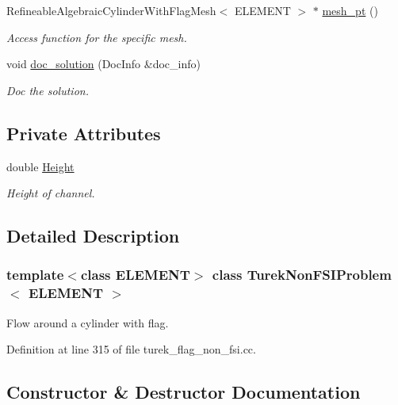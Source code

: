 \begin{DoxyCompactItemize}
Refineable\+Algebraic\+Cylinder\+With\+Flag\+Mesh$<$ E\+L\+E\+M\+E\+NT $>$ $\ast$ \hyperlink{classTurekNonFSIProblem_a46da5ab0ac3d390eba02f7a4eb2795d5}{mesh\+\_\+pt} ()
\begin{DoxyCompactList}\small\item\em Access function for the specific mesh. \end{DoxyCompactList}\item 
void \hyperlink{classTurekNonFSIProblem_a2f129e4eba71784a58b27d846fdc2a61}{doc\+\_\+solution} (Doc\+Info \&doc\+\_\+info)
\begin{DoxyCompactList}\small\item\em Doc the solution. \end{DoxyCompactList}\end{DoxyCompactItemize}
\subsection*{Private Attributes}
\begin{DoxyCompactItemize}
\item 
double \hyperlink{classTurekNonFSIProblem_a7e85e76876a9b1136cc340b0bb25e299}{Height}
\begin{DoxyCompactList}\small\item\em Height of channel. \end{DoxyCompactList}\end{DoxyCompactItemize}


\subsection{Detailed Description}
\subsubsection*{template$<$class E\+L\+E\+M\+E\+NT$>$\newline
class Turek\+Non\+F\+S\+I\+Problem$<$ E\+L\+E\+M\+E\+N\+T $>$}

Flow around a cylinder with flag. 

Definition at line 315 of file turek\+\_\+flag\+\_\+non\+\_\+fsi.\+cc.



\subsection{Constructor \& Destructor Documentation}
\mbox{\label{classTurekNonFSIProblem_aacb3214544ef81c2f8b49777457e8be6}} 
